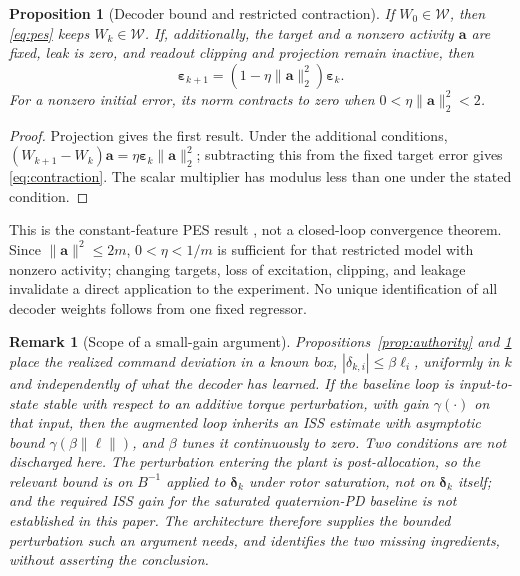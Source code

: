 \documentclass[letterpaper, 10 pt, conference]{ieeeconf}
\newtheorem{proposition}{Proposition}
\newtheorem{remark}{Remark}
\begin{document}
\begin{proposition}[Decoder bound and restricted contraction]
\label{prop:pes}
If $W_0\in\mathcal W$, then \eqref{eq:pes} keeps $W_k\in\mathcal W$.
If, additionally, the target and a nonzero activity $\bm a$ are fixed,
leak is zero, and readout clipping and projection remain inactive, then
\begin{equation}
 \bm\varepsilon_{k+1}
       =(1-\eta\|\bm a\|_2^2)\bm\varepsilon_k.
 \label{eq:contraction}
\end{equation}
For a nonzero initial error, its norm contracts to zero when
$0<\eta\|\bm a\|_2^2<2$.
\end{proposition}
\begin{proof}
Projection gives the first result. Under the additional conditions,
$(W_{k+1}-W_k)\bm a=\eta\bm\varepsilon_k\|\bm a\|_2^2$;
subtracting this from the fixed target error gives
\eqref{eq:contraction}. The scalar multiplier has modulus less than one
under the stated condition.
\end{proof}
This is the constant-feature PES result \cite{voelker2015pes}, not a
closed-loop convergence theorem. Since $\|\bm a\|^2\le2m$,
$0<\eta<1/m$ is sufficient for that restricted model with nonzero
activity; changing targets, loss of excitation, clipping, and leakage
invalidate a direct application to the experiment. No unique identification
of all decoder weights follows from one fixed regressor.

\begin{remark}[Scope of a small-gain argument]
\label{rem:smallgain}
Propositions~\ref{prop:authority} and \ref{prop:pes} place the realized
command deviation in a known box, $|\delta_{k,i}|\le\beta\ell_i$, uniformly
in $k$ and independently of what the decoder has learned. If the baseline
loop is input-to-state stable with respect to an additive torque
perturbation, with gain $\gamma(\cdot)$ on that input, then the augmented
loop inherits an ISS estimate with asymptotic bound
$\gamma(\beta\|\bm\ell\|)$, and $\beta$ tunes it continuously to zero. Two
conditions are not discharged here. The perturbation entering the plant is
post-allocation, so the relevant bound is on $B^{-1}$ applied to
$\bm\delta_k$ under rotor saturation, not on $\bm\delta_k$ itself; and the
required ISS gain for the saturated quaternion-PD baseline is not
established in this paper. The architecture therefore supplies the bounded
perturbation such an argument needs, and identifies the two missing
ingredients, without asserting the conclusion.
\end{remark}
\end{document}
